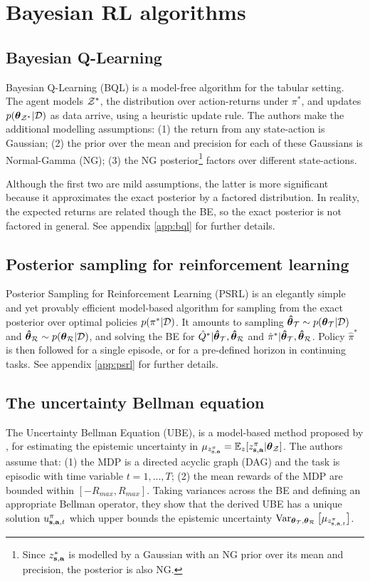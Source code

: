 \documentclass{article}
\begin{document}
\section{Bayesian RL algorithms}
\subsection{Bayesian Q-Learning}
Bayesian Q-Learning (BQL) \citep{bqlearning} is a model-free algorithm for the tabular setting. The agent models $\mathcal{Z}^*$, the distribution over action-returns under $\pi^*$, and updates $p(\boldsymbol{\theta}_{\mathcal{Z}^*} | \mathcal{D})$ as data arrive, using a heuristic update rule. The authors make the additional modelling assumptions: (1) the return from any state-action is Gaussian; (2) the prior over the mean and precision for each of these Gaussians is Normal-Gamma (NG); (3) the NG posterior\footnote{Since $z^*_{\mathbf{s}, \mathbf{a}}$ is modelled by a Gaussian with an NG prior over its mean and precision, the posterior is also NG.} factors over different state-actions.

Although the first two are mild assumptions, the latter is more significant because it approximates the exact posterior by a factored distribution. In reality, the expected returns are related though the BE, so the exact posterior is not factored in general. See appendix \ref{app:bql} for further details.

\subsection{Posterior sampling for reinforcement learning}

Posterior Sampling for Reinforcement Learning (PSRL) \citep{psrl} is an elegantly simple and yet provably efficient model-based algorithm for sampling from the exact posterior over optimal policies $p(\pi^* | \mathcal{D})$. It amounts to sampling $\boldsymbol{\hat{\theta}}_{\mathcal{T}} \sim p(\boldsymbol{\theta}_{\mathcal{T}} | \mathcal{D})$ and $\boldsymbol{\hat{\theta}}_{\mathcal{R}} \sim p(\boldsymbol{\theta}_{\mathcal{R}} | \mathcal{D})$, and solving the BE for $\hat{Q}^* | \boldsymbol{\hat{\theta}}_{\mathcal{T}}, \boldsymbol{\hat{\theta}}_{\mathcal{R}} $ and $\hat{\pi}^* | \boldsymbol{\hat{\theta}}_{\mathcal{T}}, \boldsymbol{\hat{\theta}}_{\mathcal{R}}$. Policy $\hat{\pi}^*$ is then followed for a single episode, or for a pre-defined horizon in continuing tasks. See appendix \ref{app:psrl} for further details.

\subsection{The uncertainty Bellman equation}
The Uncertainty Bellman Equation (UBE), is a model-based method proposed by \cite{ube}, for estimating the epistemic uncertainty in $\mu_{z^\pi_{\mathbf{s}, \mathbf{a}}} = \operatorname{\mathbb{E}}_z [z^\pi_{\mathbf{s}, \mathbf{a}} | \boldsymbol{\theta}_{\mathcal{Z}}]$. The authors assume that: (1) the MDP is a directed acyclic graph (DAG) and the task is episodic with time variable $t = 1, ..., T$; (2) the mean rewards of the MDP are bounded within $[-R_{max}, R_{max}]$. Taking variances across the BE and defining an appropriate Bellman operator, they show that the derived UBE has a unique solution $u_{\mathbf{s}, \mathbf{a}, t}^\pi$ which upper bounds the epistemic uncertainty $\operatorname{\text{Var}}_{\boldsymbol{\theta}_{\mathcal{T}}, \boldsymbol{\theta}_{\mathcal{R}}} \big[ \mu_{z^{\pi}_{\mathbf{s}, \mathbf{a}, t}} \big]$.
\end{document}
